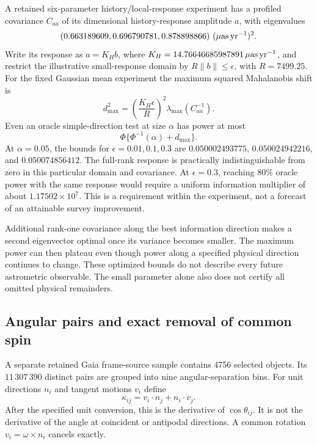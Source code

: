 A retained six-parameter history/local-response experiment has a profiled covariance $C_{aa}$ of its dimensional history-response amplitude $a$, with eigenvalues
\begin{equation}
 (0.663189609,0.696790781,0.878898866)\ (\uasy)^2.
\end{equation}
Write its response as $a=K_Hb$, where $K_H=14.76646685987891\,\mu\mathrm{as}\,\mathrm{yr}^{-1}$, and restrict the illustrative small-response domain by $R\|b\|\leq\epsilon$, with $R=7499.25$. For the fixed Gaussian mean experiment the maximum squared Mahalanobis shift is
\begin{equation}
 d_{\max}^2=\left(\frac{K_H\epsilon}{R}\right)^2
 \lambda_{\max}(C_{aa}^{-1}).
 \label{eq:powermax}
\end{equation}
Even an oracle simple-direction test at size $\alpha$ has power at most
\begin{equation}
 \Phi\{\Phi^{-1}(\alpha)+d_{\max}\}.
 \label{eq:oracle}
\end{equation}
At $\alpha=0.05$, the bounds for $\epsilon=0.01,0.1,0.3$ are $0.050002493775$, $0.050024942216$, and $0.050074856412$. The full-rank response is practically indistinguishable from zero in this particular domain and covariance. At $\epsilon=0.3$, reaching 80\% oracle power with the same response would require a uniform information multiplier of about $1.17502\times10^7$. This is a requirement within the experiment, not a forecast of an attainable survey improvement.

Additional rank-one covariance along the best information direction makes a second eigenvector optimal once its variance becomes smaller. The maximum power can then plateau even though power along a specified physical direction continues to change. These optimized bounds do not describe every future astrometric observable. The small parameter alone also does not certify all omitted physical remainders.

\subsection{Angular pairs and exact removal of common spin}

A separate retained Gaia frame-source sample contains 4756 selected objects. Its $11\,307\,390$ distinct pairs are grouped into nine angular-separation bins. For unit directions $n_i$ and tangent motions $v_i$ define
\begin{equation}
 \kappa_{ij}=v_i\cdot n_j+n_i\cdot v_j.
 \label{eq:pair}
\end{equation}
After the specified unit conversion, this is the derivative of $\cos\theta_{ij}$. It is not the derivative of the angle at coincident or antipodal directions. A common rotation $v_i=\omega\times n_i$ cancels exactly.

